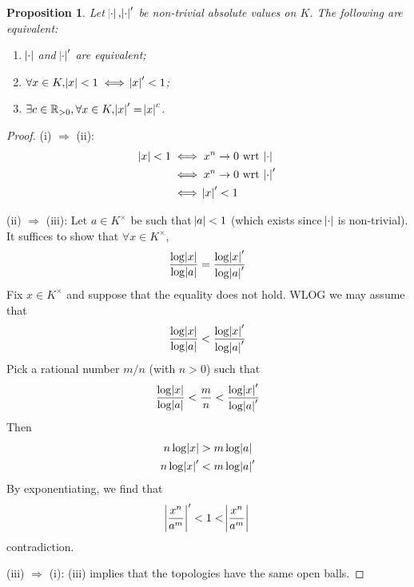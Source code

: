 \documentclass[11pt]{article}
\theoremstyle{definition}
\theoremstyle{plain}
\newtheorem{proposition}[definition]{Proposition}
\theoremstyle{remark}
\newcommand{\RR}{\mathbb{R}}
\begin{document}
\begin{proposition}\label{prop:1_3}
    Let $\abs{\cdot}, \abs{\cdot}'$ be non-trivial absolute values on $K$. The following are equivalent:
    \begin{enumerate}
        \item $\abs{\cdot}$ and $\abs{\cdot}'$ are \emph{equivalent};
        \item $\forall x \in K, \abs{x} < 1 \iff \abs{x}' < 1$;
        \item $\exists c \in \RR_{> 0}, \forall x \in K, \abs{x}' = \abs{x}^c$.
    \end{enumerate}
\end{proposition}
\begin{proof}
    (i) $\Rightarrow$ (ii):
    \begin{align*}
        \abs{x} < 1
        &\iff x^n \rightarrow 0 \text{ wrt } \abs{\cdot}\\
        &\iff x^n \rightarrow 0 \text{ wrt } \abs{\cdot}'\\
        &\iff \abs{x}' < 1
    \end{align*}

    \noindent(ii) $\Rightarrow$ (iii): Let $a \in K^\times$ be such that $\abs{a} < 1$ (which exists since $\abs{\cdot}$ is non-trivial). It suffices to show that $\forall x \in K^\times$,
    \begin{equation*}
        \frac{\log{\abs{x}}}{\log{\abs{a}}} = \frac{\log{\abs{x}'}}{\log{\abs{a}'}}
    \end{equation*}
    Fix $x \in K^\times$ and suppose that the equality does not hold. WLOG we may assume that
    \begin{equation*}
        \frac{\log{\abs{x}}}{\log{\abs{a}}} < \frac{\log{\abs{x}'}}{\log{\abs{a}'}}
    \end{equation*}
    Pick a rational number $m/n$ (with $n > 0$) such that
    \begin{equation*}
        \frac{\log{\abs{x}}}{\log{\abs{a}}} < \frac{m}{n} < \frac{\log{\abs{x}'}}{\log{\abs{a}'}}
    \end{equation*}
    Then
    \begin{align*}
        n \log{\abs{x}} &> m \log{\abs{a}} \\
        n \log{\abs{x}'} &< m \log{\abs{a}'}
    \end{align*}
    By exponentiating, we find that
    \begin{equation*}
        \abs{\frac{x^n}{a^m}}' < 1 < \abs{\frac{x^n}{a^m}}
    \end{equation*}
    contradiction.

    \noindent (iii) $\Rightarrow$ (i): (iii) implies that the topologies have the same open balls.
\end{proof}
\end{document}
